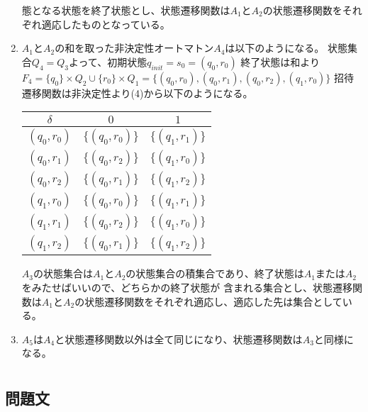\documentclass[dvipdfmx,titlepage, 11pt, a4paper]{jsarticle}%
\begin{document}
\begin{enumerate}[(1)]
  態となる状態を終了状態とし、状態遷移関数は$A_1$と$A_2$の状態遷移関数をそれぞれ適応したものとなっている。
  \item $A_1$と$A_2$の和を取った非決定性オートマトン$A_4$は以下のようになる。
  状態集合$Q_4 = Q_3$よって、初期状態$q_{init} = s_0 = (q_0, r_0)$
  終了状態は和より$F_4 = \{q_0\}\times Q_2 \cup \{r_0\} \times Q_1 = \{(q_0, r_0), (q_0, r_1), (q_0, r_2), (q_1, r_0)\}$
  招待遷移関数は非決定性より(4)から以下のようになる。
  \begin{table}[H]
    \centering
    \begin{tabular}{c|cc}
      \hline
      $\delta$ & $0$ & $1$\\
      \hline
      $(q_0, r_0)$ & $\{(q_0, r_0)\}$ & $\{(q_1, r_1)\}$\\
      $(q_0, r_1)$ & $\{(q_0, r_2)\}$ & $\{(q_1, r_0)\}$\\
      $(q_0, r_2)$ & $\{(q_0, r_1)\}$ & $\{(q_1, r_2)\}$\\
      $(q_1, r_0)$ & $\{(q_0, r_0)\}$ & $\{(q_1, r_1)\}$\\
      $(q_1, r_1)$ & $\{(q_0, r_2)\}$ & $\{(q_1, r_0)\}$\\
      $(q_1, r_2)$ & $\{(q_0, r_1)\}$ & $\{(q_1, r_2)\}$\\
      \hline
    \end{tabular}
  \end{table}
  $A_3$の状態集合は$A_1$と$A_2$の状態集合の積集合であり、終了状態は$A_1$または$A_2$をみたせばいいので、どちらかの終了状態が
  含まれる集合とし、状態遷移関数は$A_1$と$A_2$の状態遷移関数をそれぞれ適応し、適応した先は集合としている。
  \item $A_5$は$A_4$と状態遷移関数以外は全て同じになり、状態遷移関数は$A_3$と同様になる。
\end{enumerate}
\newpage
\section{}
\subsection{問題文}
\newpage
\end{document}

